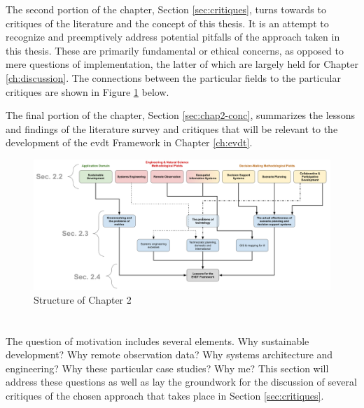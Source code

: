 The second portion of the chapter, Section \ref{sec:critiques}, turns towards to critiques of the literature and the concept of this thesis. It is an attempt to recognize and preemptively address potential pitfalls of the approach taken in this thesis. These are primarily fundamental or ethical concerns, as opposed to mere questions of implementation, the latter of which are largely held for Chapter \ref{ch:discussion}. The connections between the particular fields to the particular critiques are shown in Figure \ref{fig:lit_survey_structure} below.

The final portion of the chapter, Section \ref{sec:chap2-conc}, summarizes the lessons and findings of the literature survey and critiques that will be relevant to the development of the \ac{evdt} Framework in Chapter \ref{ch:evdt}.

\begin{landscape}
\begin{figure}[t]
	\centering
	\includegraphics[scale=0.3]{Figures/chap2/lit_survey_structure.png}
	\caption[Structure of Chapter 2]{Structure of Chapter 2}
	\label{fig:lit_survey_structure}
\end{figure}
\end{landscape}

\section{} \label{sec:motivation}

The question of motivation includes several elements. Why sustainable development? Why remote observation data? Why systems architecture and engineering? Why these particular case studies? Why me? This section will address these questions as well as lay the groundwork for the discussion of several critiques of the chosen approach that takes place in Section \ref{sec:critiques}.

\subsection{}

